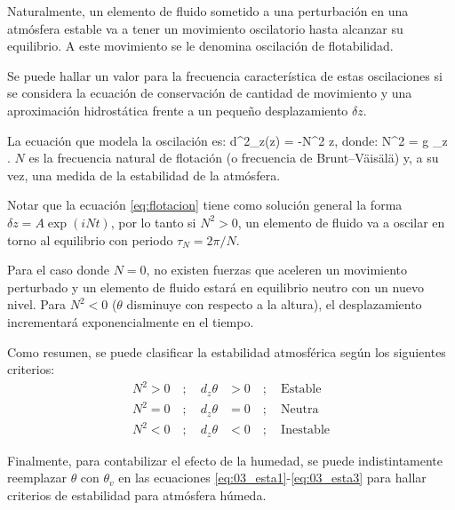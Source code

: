 Naturalmente, un elemento de fluido sometido a una perturbación en una atmósfera estable va a tener un movimiento oscilatorio hasta alcanzar su equilibrio. A este movimiento se le denomina oscilación de flotabilidad. 

Se puede hallar un valor para la frecuencia característica de estas oscilaciones si se considera la ecuación de conservación de cantidad de movimiento y una aproximación hidrostática frente a un pequeño desplazamiento $\delta z$.

La ecuación que modela la oscilación es:
\be \label{eq:flotacion}
d^2_z(\delta z) = -N^2 \delta z,
\ee 
donde:
\be 
N^2 = g \partial_z \ln \theta.
\ee
$N$ es la frecuencia natural de flotación (o frecuencia de Brunt–Väisälä) y, a su vez, una medida de la estabilidad de la atmósfera.

Notar que la ecuación \ref{eq:flotacion} tiene como solución general la forma $\delta z = A \exp(iNt)$, por lo tanto si $N^2>0$, un elemento de fluido va a oscilar en torno al equilibrio con periodo $\tau_N = 2\pi/N$. 

Para el caso donde $N=0$, no existen fuerzas que aceleren un movimiento perturbado y un elemento de fluido estará en equilibrio neutro con un nuevo nivel. Para $N^2<0$ ($\theta$ disminuye con respecto a la altura), el desplazamiento incrementará exponencialmente en el tiempo.

Como resumen, se puede clasificar la estabilidad atmosférica según los siguientes criterios:
\begin{align}
N^2>0\quad;\quad d_z \theta &> 0\quad;\quad\text{Estable}\label{eq:03_esta1}\\
N^2=0\quad;\quad d_z \theta &= 0\quad;\quad\text{Neutra} \label{eq:03_esta2}\\
N^2<0\quad;\quad d_z \theta &< 0\quad;\quad\text{Inestable} \label{eq:03_esta3}
\end{align}

Finalmente, para contabilizar el efecto de la humedad, se puede indistintamente reemplazar $\theta$ con $\theta_v$ en las ecuaciones \ref{eq:03_esta1}-\ref{eq:03_esta3} para hallar criterios de estabilidad para atmósfera húmeda.

\newpage
